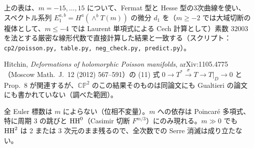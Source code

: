 \begin{rem}[\tV]
上の表は、$m=-15,\dots,15$ について、Fermat 型と Hesse 型の3次曲線を使い、スペクトル系列 $E_1^{a,b}=H^a(\wedge^bT(m))$ の微分 $d_1$ を（$m\ge-2$ では大域切断の複体として、$m\le-4$ では Laurent 単項式による Cech 計算として）素数 $32003$ を法とする厳密な線形代数で直接計算した結果と一致する（スクリプト：\texttt{cp2/poisson.py, table.py, neg\_check.py, predict.py}）。
\end{rem}
\begin{rem}[\tC\ 関連]
Hitchin, \emph{Deformations of holomorphic Poisson manifolds}, arXiv:1105.4775（Moscow Math.\ J.\ 12 (2012) 567--591）の (11) 式 $0\to T^*\xrightarrow{\sigma}T\to T|_D\to0$ と Prop.\ 8 が関連するが、$\mathbb{CP}^2$ のこの結果そのものは同論文にも Gualtieri の論文にも書かれていない（調べた範囲）。
\end{rem}

\begin{obs}\tP
全 Euler 標数は $m$ によらない（位相不変量）。$m$ への依存は Poincaré 多項式、特に周期 3 の跳びと $\mathrm{HH}^0$（Casimir 切断 $F^{m/3}$）にのみ現れる。$m\gg0$ でも $\mathrm{HH}^2$ は 2 または 3 次元のまま残るので、全次数での Serre 消滅は成り立たない。
\end{obs}
